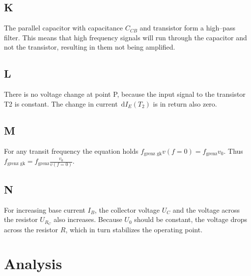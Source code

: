 \documentclass[a4paper,10pt]{article}
\newcommand{\td}{\,\text{d}}
\numberwithin{equation}{section}
\begin{document}
\begin{multicols}{2}
	\subsection{K}
        The parallel capacitor with capacitance $C_{CB}$ and transistor form a high--pass filter.
        This means that high frequency signals will run through the capacitor and not the transistor, resulting in them not being amplified.

	\subsection{L}
        There is no voltage change at point P, because the input signal to the transistor T2 is constant.
        The change in current $\td I_E\left(T_2\right)$ is in return also zero.

	\subsection{M}
        For any transit frequency the equation holds $f_\text{grenz gk}v\left(f=0\right)=f_\text{grenz}v_0$.
	Thus $f_\text{grenz gk}=f_\text{grenz}\tfrac{v_0}{v\left(f=0\right)}$.

	\subsection{N}
        For increasing base current $I_B$, the collector voltage $U_C$ and the voltage across the resistor $U_{R_C}$ also increases.
        Because $U_0$ should be constant, the voltage drops across the resistor $R$, which in turn stabilizes the operating point.

	\clearpage
	\section{Analysis}

\end{multicols}
\end{document}
